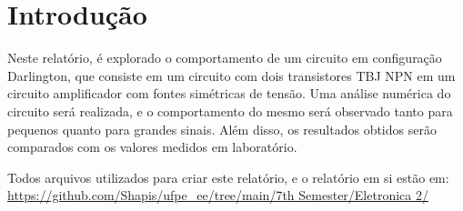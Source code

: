 \section{Introdução}

Neste relatório, é explorado o comportamento de um circuito em configuração Darlington, que consiste em um circuito com dois transistores TBJ NPN em um circuito amplificador com fontes simétricas de tensão. Uma análise numérica do circuito será realizada, e o comportamento do mesmo será observado tanto para pequenos quanto para grandes sinais. Além disso, os resultados obtidos serão comparados com os valores medidos em laboratório.

Todos arquivos utilizados para criar este relatório, e o relatório em si estão em:  \url{https://github.com/Shapis/ufpe_ee/tree/main/7th Semester/Eletronica 2/}

